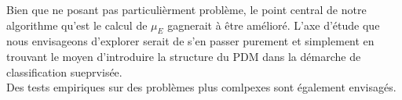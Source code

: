 \documentclass[publibook-draft]{CAp2012}
\begin{document}
Bien que ne posant pas particulièrment problème, le point central de notre algorithme qu'est le calcul de $\mu_E$ gagnerait à être amélioré. L'axe d'étude que nous envisageons d'explorer serait de s'en passer purement et simplement en trouvant le moyen d'introduire la structure du PDM dans la démarche de classification sueprvisée.\\

Des tests empiriques sur des problèmes plus comlpexes sont également envisagés.
%
%

\end{document}
